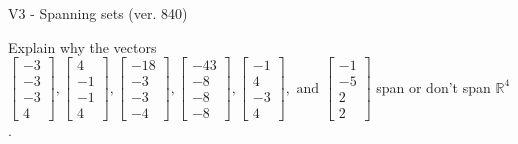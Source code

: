 \begin{exercise}
  \begin{exerciseTitle}V3 - Spanning sets (ver. 840)\end{exerciseTitle}
  \begin{exerciseStatement}
    Explain why the vectors \(\left[\begin{array}{r}
-3 \\
-3 \\
-3 \\
4
\end{array}\right] , \left[\begin{array}{r}
4 \\
-1 \\
-1 \\
4
\end{array}\right] , \left[\begin{array}{r}
-18 \\
-3 \\
-3 \\
-4
\end{array}\right] , \left[\begin{array}{r}
-43 \\
-8 \\
-8 \\
-8
\end{array}\right] , \left[\begin{array}{r}
-1 \\
4 \\
-3 \\
4
\end{array}\right] , \text{ and } \left[\begin{array}{r}
-1 \\
-5 \\
2 \\
2
\end{array}\right]\) span or don't span \(\mathbb{R}^4\). 
	



\end{exerciseStatement}
\end{exercise}

